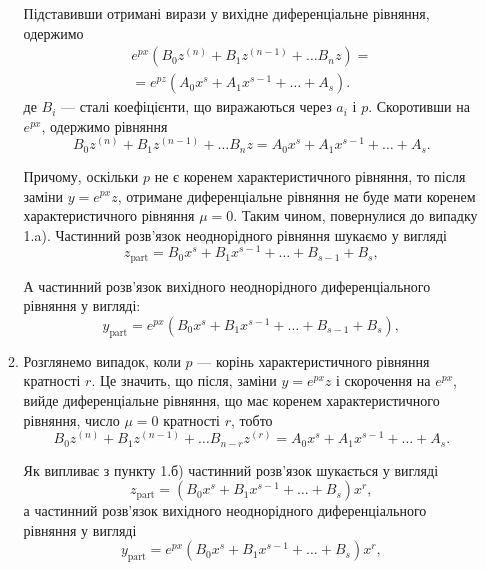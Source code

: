 \begin{enumerate}
\begin{enumerate}
		Підставивши отримані вирази у вихідне диференціальне рівняння, одержимо
		\begin{multline*}
			e^{p x} \left( B_0 z^{(n)} + B_1 z^{(n - 1)} + \ldots B_n z \right) = \\ = e^{p z} \left( A_0 x^s + A_1 x^{s - 1} + \ldots + A_s \right).
		\end{multline*}
		де $B_i$ --- сталі коефіцієнти, що виражаються через $a_i$ і $p$. Скоротивши на $e^{p x}$, одержимо рівняння 
 		\begin{equation*}
			B_0 z^{(n)} + B_1 z^{(n - 1)} + \ldots B_n z = A_0 x^s + A_1 x^{s - 1} + \ldots + A_s.
		\end{equation*}
		
		Причому, оскільки $p$ не є коренем характеристичного рівняння, то після заміни $y = e^{px} z$, отримане диференціальне рівняння не буде мати коренем характеристичного рівняння $\mu = 0$. Таким чином, повернулися до випадку 1.a). Частинний роз\-в'яз\-ок неоднорідного рівняння шукаємо у вигляді
		\begin{equation*}
			z_{\text{part}} = B_0 x^s + B_1 x^{s - 1} + \ldots + B_{s - 1} + B_s,
		\end{equation*}

		А частинний розв'язок вихідного неоднорідного диференціального рівняння у вигляді:
		\begin{equation*}
			y_{\text{part}} = e^{px} \left( B_0 x^s + B_1 x^{s - 1} + \ldots + B_{s - 1} + B_s \right),
		\end{equation*}

		\item Розглянемо випадок, коли $p$ --- корінь характеристичного рівняння кратності $r$. Це значить, що після, заміни $y = e^{px} z$ і скорочення на $e^{p x}$, вийде диференціальне рівняння, що має коренем характеристичного рівняння, число $\mu = 0$ кратності $r$, тобто
		\begin{equation*}
			B_0 z^{(n)} + B_1 z^{(n - 1)} + \ldots B_{n - r} z^{(r)} = A_0 x^s + A_1 x^{s - 1} + \ldots + A_s.
		\end{equation*}

		Як випливає з пункту 1.б) частинний розв'язок шукається у вигляді
		\begin{equation*}
			z_{\text{part}} = \left( B_0 x^s + B_1 x^{s - 1} + \ldots + B_s \right) x^r,
		\end{equation*}
		а частинний розв'язок вихідного неоднорідного диференціального рівняння у вигляді
		\begin{equation*}
			y_{\text{part}} = e^{p x} \left( B_0 x^s + B_1 x^{s - 1} + \ldots + B_s \right) x^r,
		\end{equation*}
 	\end{enumerate}
 	

\end{enumerate}
